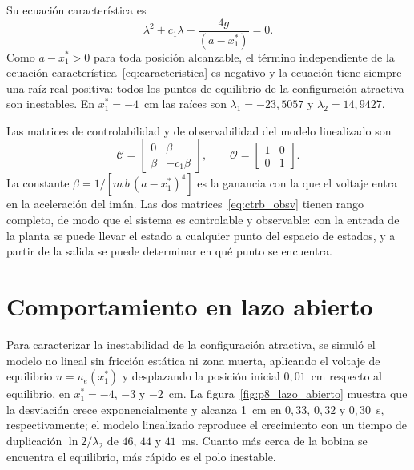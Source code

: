 Su ecuación característica es
\begin{equation}
\lambda^2 + c_1\lambda - \dfrac{4g}{(a-x_1^{\ast})} = 0 .
\label{eq:caracteristica}
\end{equation}
Como $a - x_1^{\ast} > 0$ para toda posición alcanzable, el término independiente de la ecuación característica~\eqref{eq:caracteristica} es negativo y la ecuación tiene siempre una raíz real positiva: todos los puntos de equilibrio de la configuración atractiva son inestables. En $x_1^{\ast}=-4$~cm las raíces son $\lambda_1 = -23{,}5057$ y $\lambda_2 = 14{,}9427$.

Las matrices de controlabilidad y de observabilidad del modelo linealizado son
\begin{equation}
\mathcal{C}
=
\begin{bmatrix}
0 & \beta\\[6pt]
\beta & -c_1 \beta
\end{bmatrix} ,
\qquad
\mathcal{O}
=
\begin{bmatrix}
1 & 0\\[6pt]
0 & 1
\end{bmatrix} .
\label{eq:ctrb_obsv}
\end{equation}
La constante $\beta = 1/[m\,b\,(a-x_1^{\ast})^4]$ es la ganancia con la que el voltaje entra en la aceleración del imán. Las dos matrices~\eqref{eq:ctrb_obsv} tienen rango completo, de modo que el sistema es controlable y observable: con la entrada de la planta se puede llevar el estado a cualquier punto del espacio de estados, y a partir de la salida se puede determinar en qué punto se encuentra.

\section{Comportamiento en lazo abierto}\label{sec:lazo_abierto}

Para caracterizar la inestabilidad de la configuración atractiva, se simuló el modelo no lineal sin fricción estática ni zona muerta, aplicando el voltaje de equilibrio $u=u_e(x_1^*)$ y desplazando la posición inicial $0{,}01$~cm respecto al equilibrio, en $x_1^*=-4$, $-3$ y $-2$~cm. La figura~\ref{fig:p8_lazo_abierto} muestra que la desviación crece exponencialmente y alcanza 1~cm en $0{,}33$, $0{,}32$ y $0{,}30$~s, respectivamente; el modelo linealizado reproduce el crecimiento con un tiempo de duplicación $\ln 2/\lambda_2$ de $46$, $44$ y $41$~ms. Cuanto más cerca de la bobina se encuentra el equilibrio, más rápido es el polo inestable.

